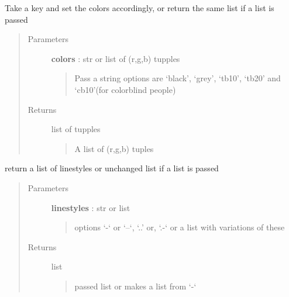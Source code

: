 \documentclass[letterpaper,10pt,english]{sphinxmanual}
\begin{document}
\begin{fulllineitems}
\label{pubplots:pubplots.plot.set_colors}
Take a key and set the colors accordingly, or return the same list if a list is passed
\begin{quote}\begin{description}
\item[{Parameters}] \leavevmode
\textbf{colors} : str or list of (r,g,b) tupples
\begin{quote}

Pass a string options are `black', `grey', `tb10', `tb20' and `cb10'(for colorblind people)
\end{quote}

\item[{Returns}] \leavevmode
list of tupples
\begin{quote}

A list of (r,g,b) tuples
\end{quote}

\end{description}\end{quote}

\end{fulllineitems}


\begin{fulllineitems}
\label{pubplots:pubplots.plot.set_linestyles}
return a list of linestyles or unchanged list if a list is passed
\begin{quote}\begin{description}
\item[{Parameters}] \leavevmode
\textbf{linestyles} : str or list
\begin{quote}

options `-` or `--`, `..' or, `.-` or a list with variations of these
\end{quote}

\item[{Returns}] \leavevmode
list
\begin{quote}

passed list or makes a list from `-`
\end{quote}

\end{description}\end{quote}

\end{fulllineitems}
\end{document}
